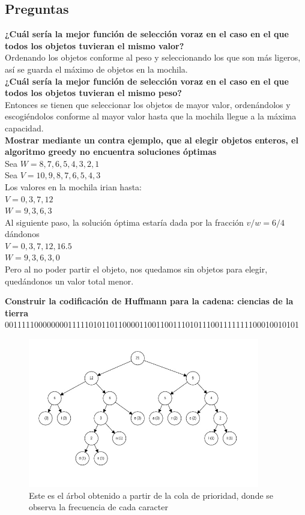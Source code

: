 \documentclass{article}
\begin{document}
    \subsection{Preguntas}
    \textbf{¿Cuál sería la mejor función de selección voraz en el caso en el que todos los objetos tuvieran el mismo valor?}\\
    Ordenando los objetos conforme al peso y seleccionando los que son más ligeros, así se guarda el máximo de objetos en la mochila.\\
    \textbf{¿Cuál sería la mejor función de selección voraz en el caso en el que todos los objetos tuvieran el mismo peso?}\\
    Entonces se tienen que seleccionar los objetos de mayor valor, ordenándolos y escogiéndolos conforme al mayor valor hasta que la mochila llegue a la máxima capacidad.\\
    \newpage
    \textbf{Mostrar mediante un contra ejemplo, que al elegir objetos enteros, el algoritmo greedy no encuentra soluciones óptimas}\\
    Sea $W={8,7,6,5,4,3,2,1}$\\
    Sea $V={10,9,8,7,6,5,4,3}$\\
    Los valores en la mochila irian hasta:\\
    $V={0,3,7,12}$\\
    $W={9,3,6,3}$\\
    Al siguiente paso, la solución óptima estaría dada por la fracción $v/w = 6/4$ dándonos\\
    $V={0,3,7,12,16.5}$\\
    $W={9,3,6,3,0}$\\
    Pero al no poder partir el objeto, nos quedamos sin objetos para elegir, quedándonos un valor total menor.
    
    \textbf{Construir la codificación de Huffmann para la cadena: ciencias de la tierra}\\
    0011111000000001111101011011000011001100111010111001111111100010010101\\
     \begin{figure}[h!]
        \centering
        \includegraphics[width=0.9\textwidth]{huffmann_tree.jpeg}
        \caption{Este es el árbol obtenido a partir de la cola de prioridad, donde se observa la frecuencia de cada caracter}
        \label{fig:my_label}
    \end{figure}
    
\end{document}
